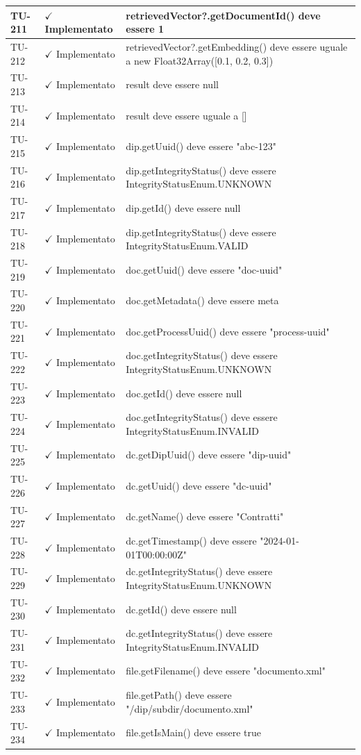 ﻿\documentclass[a4paper,12pt]{article}
\newcommand{\ok}{\textcolor{green!60!black}{$\checkmark$ Implementato}}
\begin{document}
\begin{longtable}{|p{2cm}|p{3.5cm}|p{9.5cm}|}
\hline
TU-211 & \ok & retrievedVector?.getDocumentId() deve essere 1 \\
\hline
TU-212 & \ok & retrievedVector?.getEmbedding() deve essere uguale a new Float32Array([0.1, 0.2, 0.3]) \\
\hline
TU-213 & \ok & result deve essere null \\
\hline
TU-214 & \ok & result deve essere uguale a [] \\
\hline
TU-215 & \ok & dip.getUuid() deve essere "abc-123" \\
\hline
TU-216 & \ok & dip.getIntegrityStatus() deve essere IntegrityStatusEnum.UNKNOWN \\
\hline
TU-217 & \ok & dip.getId() deve essere null \\
\hline
TU-218 & \ok & dip.getIntegrityStatus() deve essere IntegrityStatusEnum.VALID \\
\hline
TU-219 & \ok & doc.getUuid() deve essere "doc-uuid" \\
\hline
TU-220 & \ok & doc.getMetadata() deve essere meta \\
\hline
TU-221 & \ok & doc.getProcessUuid() deve essere "process-uuid" \\
\hline
TU-222 & \ok & doc.getIntegrityStatus() deve essere IntegrityStatusEnum.UNKNOWN \\
\hline
TU-223 & \ok & doc.getId() deve essere null \\
\hline
TU-224 & \ok & doc.getIntegrityStatus() deve essere IntegrityStatusEnum.INVALID \\
\hline
TU-225 & \ok & dc.getDipUuid() deve essere "dip-uuid" \\
\hline
TU-226 & \ok & dc.getUuid() deve essere "dc-uuid" \\
\hline
TU-227 & \ok & dc.getName() deve essere "Contratti" \\
\hline
TU-228 & \ok & dc.getTimestamp() deve essere "2024-01-01T00:00:00Z" \\
\hline
TU-229 & \ok & dc.getIntegrityStatus() deve essere IntegrityStatusEnum.UNKNOWN \\
\hline
TU-230 & \ok & dc.getId() deve essere null \\
\hline
TU-231 & \ok & dc.getIntegrityStatus() deve essere IntegrityStatusEnum.INVALID \\
\hline
TU-232 & \ok & file.getFilename() deve essere "documento.xml" \\
\hline
TU-233 & \ok & file.getPath() deve essere "/dip/subdir/documento.xml" \\
\hline
TU-234 & \ok & file.getIsMain() deve essere true \\

\end{longtable}
\end{document}
